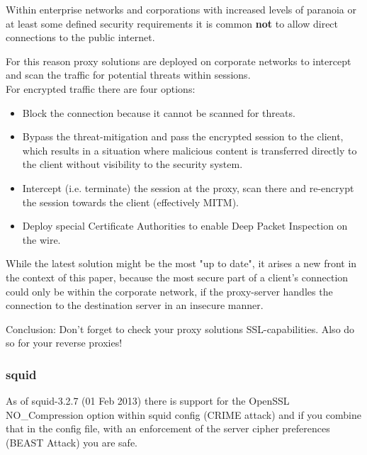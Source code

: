 
Within enterprise networks and corporations with increased levels of paranoia or at least some defined security requirements it is common \textbf{not} to allow direct connections to the public internet.

For this reason proxy solutions are deployed on corporate networks to intercept and scan the traffic for potential threats within sessions.\\

For encrypted traffic there are four options:

\begin{itemize}
\item Block the connection because it cannot be scanned for threats.
\item Bypass the threat-mitigation and pass the encrypted session to the client, which results in a situation where malicious content is transferred directly to the client without visibility to the security system.
\item Intercept (i.e. terminate) the session at the proxy, scan there and re-encrypt the session towards the client (effectively MITM).
\item Deploy special Certificate Authorities to enable Deep Packet Inspection on the wire.
\end{itemize}

While the latest solution might be the most "up to date", it arises a new front in the context of this paper, because the most secure part of a client's connection could only be within the corporate network, if the proxy-server handles the connection to the destination server in an insecure manner.

Conclusion: Don't forget to check your proxy solutions SSL-capabilities. Also do so for your reverse proxies!

\subsubsection{squid}


As of squid-3.2.7 (01 Feb 2013) there is support for the OpenSSL NO\_Compression option within squid config (CRIME attack) and if you combine that in the config file, with an enforcement of the server cipher preferences (BEAST Attack) you are safe.

